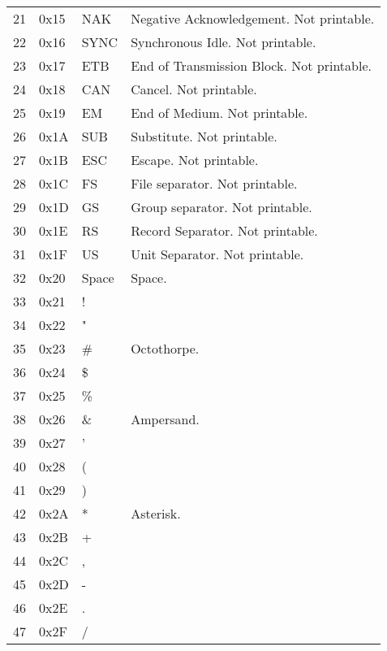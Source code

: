 \documentclass[11pt,fleqn]{book} %
\begin{document}
\begin{table}[]
\begin{tabular}{|l|l|l|l|}
21            & 0x15      & NAK       & Negative Acknowledgement.  Not printable. \\
22            & 0x16      & SYNC      & Synchronous Idle.  Not printable. \\
23            & 0x17      & ETB       & End of Transmission Block.  Not printable. \\
24            & 0x18      & CAN       & Cancel.  Not printable. \\
25            & 0x19      & EM        & End of Medium.  Not printable.\\
26            & 0x1A      & SUB       & Substitute. Not printable. \\
27            & 0x1B      & ESC       & Escape.  Not printable. \\
28            & 0x1C      & FS        & File separator.  Not printable. \\
29            & 0x1D      & GS        & Group separator.  Not printable. \\
30            & 0x1E      & RS        & Record Separator.  Not printable. \\
31            & 0x1F      & US        & Unit Separator.  Not printable. \\
32            & 0x20      & Space     & Space. \\
33            & 0x21      & !         & \\
34            & 0x22      & "         & \\
35            & 0x23      & \#         & Octothorpe. \\
36            & 0x24      & \$         & \\
37            & 0x25      & \%         & \\
38            & 0x26      & \&         & Ampersand. \\
39            & 0x27      & '          & \\
40            & 0x28      & (          & \\
41            & 0x29      & )          & \\
42            & 0x2A      & *          & Asterisk. \\
43            & 0x2B      & +          & \\
44            & 0x2C      & ,          & \\
45            & 0x2D      & -          & \\
46            & 0x2E      & .          & \\
47            & 0x2F      & /          & \\
\hline

\end{tabular}
\end{table}
\end{document}
